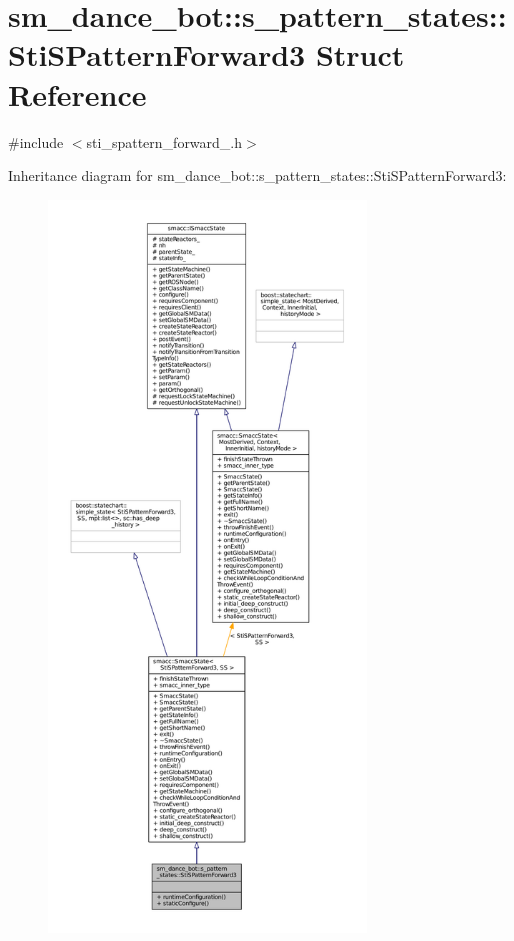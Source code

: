 \hypertarget{structsm__dance__bot_1_1s__pattern__states_1_1StiSPatternForward3}{}\section{sm\+\_\+dance\+\_\+bot\+:\+:s\+\_\+pattern\+\_\+states\+:\+:Sti\+S\+Pattern\+Forward3 Struct Reference}
\label{structsm__dance__bot_1_1s__pattern__states_1_1StiSPatternForward3}


{\ttfamily \#include $<$sti\+\_\+spattern\+\_\+forward\+\_.\+h$>$}



Inheritance diagram for sm\+\_\+dance\+\_\+bot\+:\+:s\+\_\+pattern\+\_\+states\+:\+:Sti\+S\+Pattern\+Forward3\+:
\nopagebreak
\begin{figure}[H]
\begin{center}
\leavevmode
\includegraphics[height=550pt]{structsm__dance__bot_1_1s__pattern__states_1_1StiSPatternForward3__inherit__graph}
\end{center}
\end{figure}


